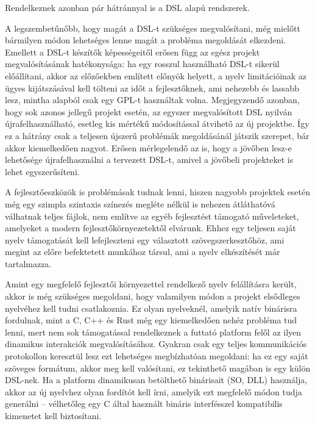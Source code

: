 Rendelkeznek azonban pár hátránnyal is a \gls{DSL} alapú rendszerek.

A legszembetűnőbb, hogy magát a \gls{DSL}-t szükséges megvalósítani, még mielőtt bármilyen módon lehetséges lenne magát a probléma megoldását elkezdeni.
Emellett a \gls{DSL}-t készítők képességeitől erősen függ az egész projekt megvalósításának hatékonysága: ha egy rosszul használható \gls{DSL}-t sikerül előállítani, akkor az előzőekben említett előnyök helyett, a nyelv limitációinak az ügyes kijátszásával kell tölteni az időt a fejlesztőknek, ami nehezebb és lassabb lesz, mintha alapból csak egy \gls{GPL}-t használtak volna.
Megjegyzendő azonban, hogy sok azonos jellegű projekt esetén, az egyszer megvalósított \gls{DSL} nyilván újrafelhasználható, esetleg kis mértékű módosítással átvihető az új projektbe. Így ez a hátrány csak a teljesen újszerű problémák megoldásánál játszik szerepet, bár akkor kiemelkedően nagyot.
Erősen mérlegelendő az is, hogy a jövőben lesz-e lehetősége újrafelhasználni a tervezett \gls{DSL}-t, amivel a jövőbeli projekteket is lehet egyszerűsíteni.

A fejlesztőeszközök is problémásak tudnak lenni, hiszen nagyobb projektek esetén még egy szimpla szintaxis színezés megléte nélkül is nehezen átláthatóvá válhatnak teljes fájlok, nem említve az egyéb fejlesztést támogató műveleteket, amelyeket a modern fejlesztőkörnyezetektől elvárunk.
Ehhez egy teljesen saját nyelv támogatását kell lefejleszteni egy választott szövegszerkesztőhöz, ami megint az előre befektetett munkához társul, ami a nyelv elkészítését már tartalmazza.

Amint egy megfelelő fejlesztői környezettel rendelkező nyelv felállításra került, akkor is még szükséges megoldani, hogy valamilyen módon a projekt elsődleges nyelvéhez kell tudni csatlakoznia.
Ez olyan nyelveknél, amelyik natív binárisra fordulnak, mint a C, C++ és Rust még egy kiemelkedően nehéz probléma tud lenni, mert nem sok támogatással rendelkeznek a futtató platform felől az ilyen dinamikus interakciók megvalósításához.
Gyakran csak egy teljes kommunikációs protokollon keresztül lesz ezt lehetséges megbízhatóan megoldani: ha ez egy saját szöveges formátum, akkor meg kell valósítani, ez tekinthető magában is egy külön \gls{DSL}-nek.
Ha a platform dinamikusan betölthető binárisait (\gls{SO}, \gls{DLL}) használja, akkor az új nyelvhez olyan fordítót kell írni, amelyik ezt megfelelő módon tudja generálni -- vélhetőleg egy C által használt bináris interfésszel kompatibilis kimenetet kell biztosítani.

